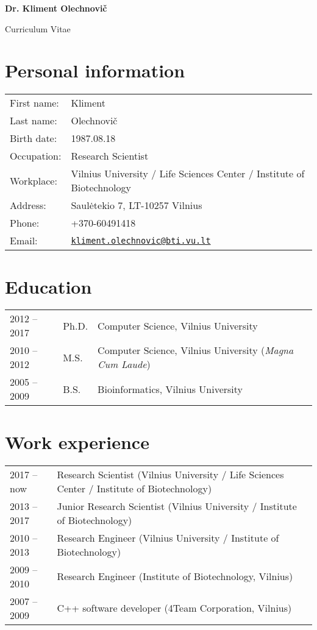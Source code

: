 \documentclass{article}
\def\name{Dr. Kliment Olechnovič}
\begin{document}
\begin{center}
{\huge \bf \name}
\end{center}

\begin{center}
{\Large Curriculum Vitae}
\end{center}


\section*{Personal information}
\begin{tabular}{p{}p{}}
First name:          & Kliment\\
Last name:           & Olechnovič\\
Birth date:          & 1987.08.18 \\
Occupation:          & Research Scientist \\
Workplace:           & Vilnius University / Life Sciences Center / Institute of Biotechnology \\
Address:             & Saulėtekio 7, LT-10257 Vilnius \\
Phone:               & +370-60491418 \\
Email:               & \href{mailto:kliment.olechnovic@bti.vu.lt}{\tt kliment.olechnovic@bti.vu.lt} \\
\end{tabular}


\section*{Education}
\begin{tabular}{p{}p{}p{}}
2012 -- 2017 & Ph.D. & Computer Science, Vilnius University \\
2010 -- 2012 & M.S.  & Computer Science, Vilnius University (\emph{Magna Cum Laude}) \\
2005 -- 2009 & B.S.  & Bioinformatics, Vilnius University
\end{tabular}


\section*{Work experience}
\begin{tabular}{p{}p{}}
2017 -- now  & Research Scientist (Vilnius University / Life Sciences Center / Institute of Biotechnology)\\
2013 -- 2017 & Junior Research Scientist (Vilnius University / Institute of Biotechnology) \\
2010 -- 2013 & Research Engineer (Vilnius University / Institute of Biotechnology) \\
2009 -- 2010 & Research Engineer (Institute of Biotechnology, Vilnius) \\
2007 -- 2009 & C++ software developer (4Team Corporation, Vilnius)
\end{tabular}
\end{document}
